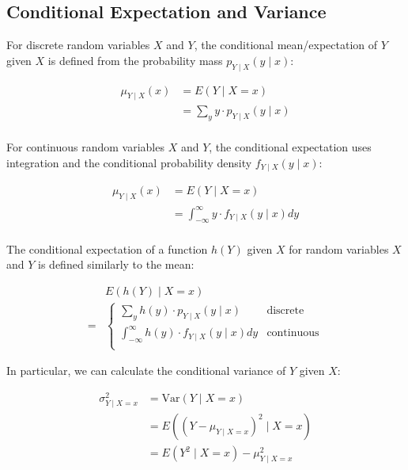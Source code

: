 \subsection*{Conditional Expectation and Variance}

For discrete random variables $X$ and $Y$, the conditional mean/expectation of $Y$ given $X$ is defined from the probability mass $p_{Y\mid X}(y\mid x)$:

\begin{align*}
    \mu_{Y\mid X}(x) & = E(Y\mid X=x)                          \\
                     & = \sum_{y} y\cdot  p_{Y\mid X}(y\mid x) \\
\end{align*}

For continuous random variables $X$ and $Y$, the conditional expectation uses integration and the conditional probability density $f_{Y\mid X}(y\mid x)$:

\begin{align*}
    \mu_{Y\mid X}(x) & = E(Y\mid X=x)                                           \\
                     & = \int_{-\infty}^{\infty} y\cdot f_{Y\mid X}(y\mid x) dy \\
\end{align*}

The conditional expectation of a function $h(Y)$ given $X$ for random variables $X$ and $Y$ is defined similarly to the mean:

\begin{align*}
      & E(h(Y)\mid X=x)                                                               \\
    = & \begin{cases}
            \sum_{y} h(y)\cdot p_{Y\mid X}(y\mid x)                   & \text{discrete}   \\
            \int_{-\infty}^{\infty} h(y)\cdot f_{Y\mid X}(y\mid x) dy & \text{continuous} \\
        \end{cases}
\end{align*}

In particular, we can calculate the conditional variance of $Y$ given $X$:

\begin{align*}
    \sigma^2_{Y\mid X=x} & = \text{Var}(Y\mid X=x)              \\
                         & = E((Y-\mu_{Y\mid X=x})^2\mid X=x)   \\
                         & = E(Y^2\mid X=x) - \mu_{Y\mid X=x}^2 \\
\end{align*}


